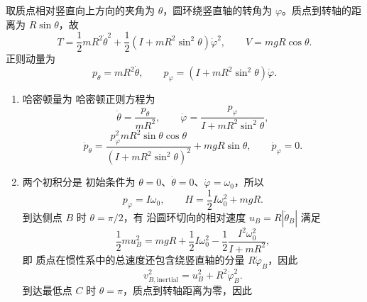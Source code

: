 \begin{question}[转动圆环中的质点]
\begin{solution}
取质点相对竖直向上方向的夹角为 $\theta$，圆环绕竖直轴的转角为 $\varphi$。质点到转轴的距离为 $R\sin\theta$，故
\[
  T=\frac12mR^2\dot\theta^2
  +\frac12\left(I+mR^2\sin^2\theta\right)\dot\varphi^2,
  \qquad
  V=mgR\cos\theta .
\]
正则动量为
\[
  p_\theta=mR^2\dot\theta,
  \qquad
  p_\varphi=\left(I+mR^2\sin^2\theta\right)\dot\varphi .
\]
\begin{enumerate}
  \item 哈密顿量为
  哈密顿正则方程为
  \[
    \dot\theta=\frac{p_\theta}{mR^2},
    \qquad
    \dot\varphi=\frac{p_\varphi}{I+mR^2\sin^2\theta},
  \]
  \[
    \dot p_\theta=\frac{p_\varphi^2mR^2\sin\theta\cos\theta}
    {(I+mR^2\sin^2\theta)^2}+mgR\sin\theta,
    \qquad
    \dot p_\varphi=0 .
  \]
  \item 两个初积分是
  初始条件为 $\theta=0$、$\dot\theta=0$、$\dot\varphi=\omega_0$，所以
  \[
    p_\varphi=I\omega_0,
    \qquad
    H=\frac12I\omega_0^2+mgR .
  \]
  到达侧点 $B$ 时 $\theta=\pi/2$，有
  沿圆环切向的相对速度 $u_B=R|\dot\theta_B|$ 满足
  \[
    \frac12m u_B^2
    =mgR+\frac12I\omega_0^2-\frac12\frac{I^2\omega_0^2}{I+mR^2},
  \]
  即
  质点在惯性系中的总速度还包含绕竖直轴的分量 $R\dot\varphi_B$，因此
  \[
    v_{B,\mathrm{inertial}}^2
    =u_B^2+R^2\dot\varphi_B^2 .
  \]
  到达最低点 $C$ 时 $\theta=\pi$，质点到转轴距离为零，因此
\end{enumerate}
\end{solution}

\end{question}

